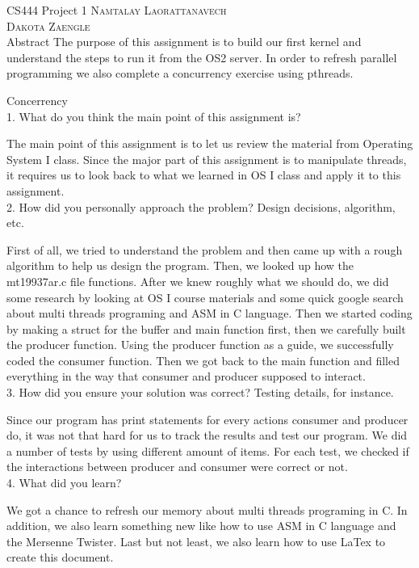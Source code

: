 \documentclass[letterpaper,10pt]{article}
\begin{document}
\begin{titlepage}
   \centering
   \vspace*{\baselineskip}
   {\LARGE CS444 Project 1}
   \vspace{2\baselineskip}
   {\scshape\Large Namtalay Laorattanavech \\ Dakota Zaengle \\}
   \vspace{2\baselineskip}
   Abstract
   \vspace{0.5\baselineskip}
   The purpose of this assignment is to build our first kernel and understand the steps to run it from the OS2 server. In order to refresh parallel programming we also complete a concurrency exercise using pthreads.
\end{titlepage}

Concerrency \\

1.	What do you think the main point of this assignment is?

The main point of this assignment is to let us review the material from Operating System I class. Since the major part of this assignment is to manipulate threads, it requires us to look back to what we learned in OS I class and apply it to this assignment.\\

2.	How did you personally approach the problem? Design decisions, algorithm, etc.

First of all, we tried to understand the problem and then came up with a rough algorithm to help us design the program. Then, we looked up how the mt19937ar.c file functions. After we knew roughly what we should do, we did some research by looking at OS I course materials and some quick google search about multi threads programing and ASM in C language.  Then we started coding by making a struct for the buffer and main function first, then we carefully built the producer function. Using the producer function as a guide, we successfully coded the consumer function. Then we got back to the main function and filled everything in the way that consumer and producer supposed to interact.\\

3.	How did you ensure your solution was correct? Testing details, for instance.

Since our program has print statements for every actions consumer and producer do, it was not that hard for us to track the results and test our program. We did a number of tests by using different amount of items. For each test, we checked if the interactions between producer and consumer were correct or not.\\

4.	What did you learn?

We got a chance to refresh our memory about multi threads programing in C. In addition, we also learn something new like how to use ASM in C language and the Mersenne Twister. Last but not least, we also learn how to use LaTex to create this document.\\
\end{document}
